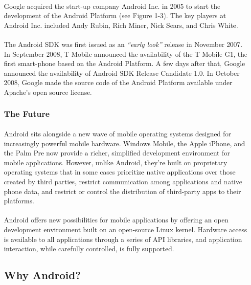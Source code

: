 \paragraph{}
Google acquired the start-up company Android Inc. in 2005 to start the development of the Android Platform (see Figure 1-3). The key players at Android Inc. included Andy Rubin, Rich Miner, Nick Sears, and Chris White.

\paragraph{}
The Android SDK was first issued as an \emph{“early look”} release in November 2007. In September 2008, T-Mobile announced the availability of the T-Mobile G1, the first smart-phone based on the Android Platform. A few days after that, Google announced the availability of Android SDK Release Candidate 1.0. In October 2008, Google made the source code of the Android Platform available under Apache's open source license.

\subsubsection{The Future}

\paragraph{}
Android sits alongside a new wave of mobile operating systems designed for increasingly powerful mobile hardware. Windows Mobile, the Apple iPhone, and the Palm Pre now provide a richer, simplified development environment for mobile applications. However, unlike Android, they’re built on proprietary operating systems that in some cases prioritize native applications over those created by third parties, restrict communication among applications and native phone data, and restrict or control the distribution of third-party apps to their platforms.

\paragraph{}
Android offers new possibilities for mobile applications by offering an open development environment built on an open-source Linux kernel. Hardware access is available to all applications through a series of API libraries, and application interaction, while carefully controlled, is fully supported.

\subsection{Why Android?}
